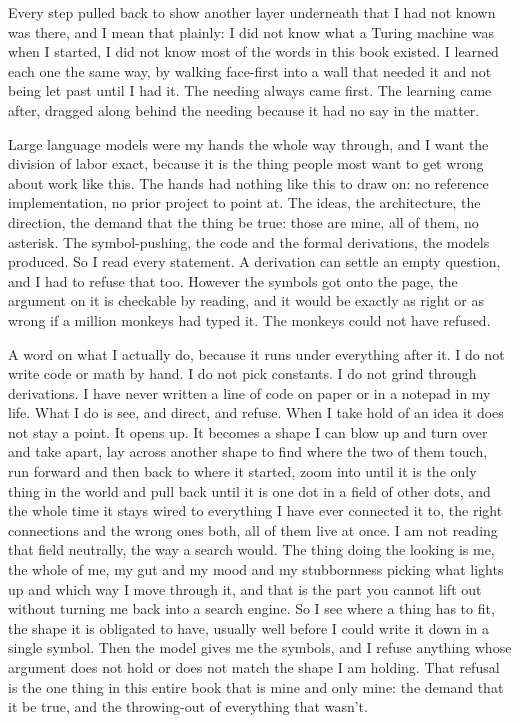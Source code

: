 \documentclass[11pt,twoside]{article}
\theoremstyle{thielethm}
\theoremstyle{thieledef}
\theoremstyle{thieledef}
\theoremstyle{thieledef}
\theoremstyle{thielethm}
\theoremstyle{thieleobs}
\theoremstyle{thielethm}
\begin{document}
Every step pulled back to show another layer underneath that I had not known was there, and I mean that plainly: I did not know what a Turing machine was when I started, I did not know most of the words in this book existed. I learned each one the same way, by walking face-first into a wall that needed it and not being let past until I had it. The needing always came first. The learning came after, dragged along behind the needing because it had no say in the matter.

Large language models were my hands the whole way through, and I want the division of labor exact, because it is the thing people most want to get wrong about work like this. The hands had nothing like this to draw on: no reference implementation, no prior project to point at. The ideas, the architecture, the direction, the demand that the thing be true: those are mine, all of them, no asterisk. The symbol-pushing, the code and the formal derivations, the models produced. So I read every statement. A derivation can settle an empty question, and I had to refuse that too. However the symbols got onto the page, the argument on it is checkable by reading, and it would be exactly as right or as wrong if a million monkeys had typed it. The monkeys could not have refused.

A word on what I actually do, because it runs under everything after it. I do not write code or math by hand. I do not pick constants. I do not grind through derivations. I have never written a line of code on paper or in a notepad in my life. What I do is see, and direct, and refuse. When I take hold of an idea it does not stay a point. It opens up. It becomes a shape I can blow up and turn over and take apart, lay across another shape to find where the two of them touch, run forward and then back to where it started, zoom into until it is the only thing in the world and pull back until it is one dot in a field of other dots, and the whole time it stays wired to everything I have ever connected it to, the right connections and the wrong ones both, all of them live at once. I am not reading that field neutrally, the way a search would. The thing doing the looking is me, the whole of me, my gut and my mood and my stubbornness picking what lights up and which way I move through it, and that is the part you cannot lift out without turning me back into a search engine. So I see where a thing has to fit, the shape it is obligated to have, usually well before I could write it down in a single symbol. Then the model gives me the symbols, and I refuse anything whose argument does not hold or does not match the shape I am holding. That refusal is the one thing in this entire book that is mine and only mine: the demand that it be true, and the throwing-out of everything that wasn't.
\end{document}
